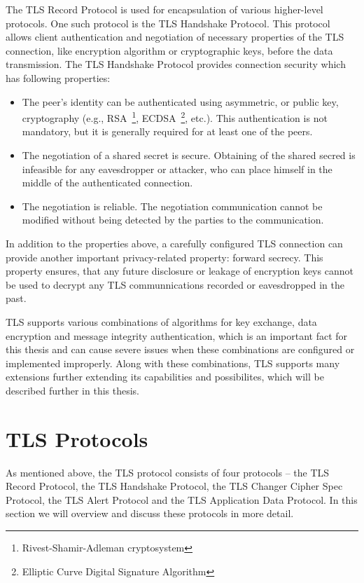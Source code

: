     The TLS Record Protocol is used for encapsulation of various higher-level
    protocols. One such protocol is the TLS Handshake Protocol. This protocol
    allows client authentication and negotiation of necessary properties
    of the TLS connection, like encryption algorithm or cryptographic keys,
    before the data transmission. The TLS Handshake Protocol provides
    connection security which has following properties:
    \begin{itemize}
        \item The peer's identity can be authenticated using asymmetric, or
        public key, cryptography (e.g.,
        RSA~\footnote{Rivest-Shamir-Adleman cryptosystem},
        ECDSA~\footnote{Elliptic Curve Digital Signature Algorithm}, etc.).
        This authentication is not mandatory, but it is generally required
        for at least one of the peers.
        \item The negotiation of a shared secret is secure. Obtaining of
        the shared secred is infeasible for any eavesdropper or attacker,
        who can place himself in the middle of the authenticated connection.
        \item The negotiation is reliable. The negotiation communication
        cannot be modified without being detected by the parties to the
        communication.~\cite{rfc5246}
    \end{itemize}

    In addition to the properties above, a carefully configured TLS connection
    can provide another important privacy-related property: forward secrecy.
    This property ensures, that any future disclosure or leakage of encryption
    keys cannot be used to decrypt any TLS communnications recorded or
    eavesdropped in the past.

    TLS supports various combinations of algorithms for key exchange, data
    encryption and message integrity authentication, which is an important fact
    for this thesis and can cause severe issues when these combinations
    are configured or implemented improperly. Along with these combinations,
    TLS supports many extensions further extending its capabilities and possibilites,
    which will be described further in this thesis.


\section{TLS Protocols}
    As mentioned above, the TLS protocol consists of four protocols --
    the TLS Record Protocol, the TLS Handshake Protocol, the TLS Changer Cipher
    Spec Protocol, the TLS Alert Protocol and the TLS Application Data Protocol.
    In this section we will overview and discuss these protocols in more detail.

